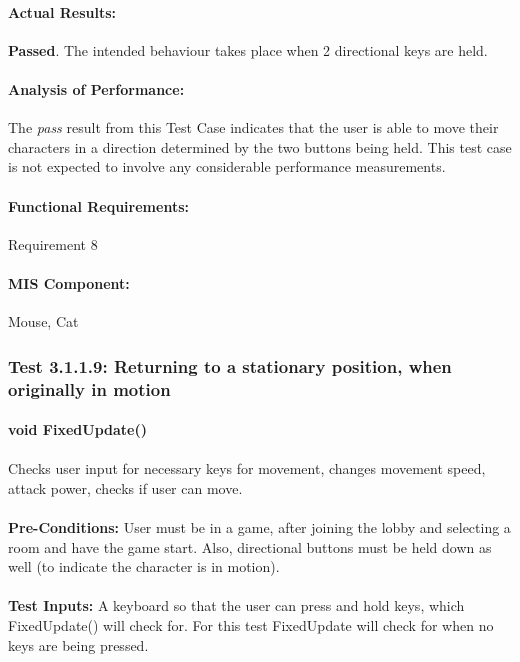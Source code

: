 \documentclass{article}
\begin{document}
    \paragraph{Actual Results:} \textbf{Passed}. The intended behaviour takes place when 2 directional keys are held.
    \paragraph{Analysis of Performance:} The \emph{pass} result from this Test Case indicates that the user is able to move their characters in a direction determined by the two buttons being held. This test case is not expected to involve any considerable performance measurements.
    \paragraph{Functional Requirements:} Requirement 8
    \paragraph{MIS Component:} Mouse, Cat 
    
    \subsubsection{Test 3.1.1.9: Returning to a stationary position, when originally in motion}
    \paragraph{}\textbf{void FixedUpdate()}
    \paragraph{} Checks user input for necessary keys for movement, changes movement speed, attack power, checks if user can move.
    \paragraph{}\textbf{Pre-Conditions:} User must be in a game, after joining the lobby and selecting a room and have the game start. Also, directional buttons must be held down as well (to indicate the character is in motion). 
    \paragraph{}\textbf{Test Inputs:} A keyboard so that the user can press and hold keys, which FixedUpdate() will check for. For this test FixedUpdate will check for when no keys are being pressed.
\end{document}
